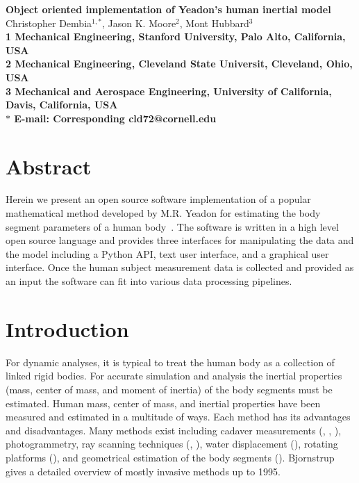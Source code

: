 \documentclass[10pt]{article}
\date{}
\begin{document}
\begin{flushleft}
{\Large
\textbf{Object oriented implementation of Yeadon's human inertial model}
}
\\
Christopher Dembia$^{1,\ast}$,
Jason K. Moore$^{2}$,
Mont Hubbard$^{3}$
\\
\bf{1} Mechanical Engineering, Stanford University, Palo Alto, California, USA
\\
\bf{2} Mechanical Engineering, Cleveland State Universit, Cleveland, Ohio, USA
\\
\bf{3} Mechanical and Aerospace Engineering, University of California, Davis, California, USA
\\
$\ast$ E-mail: Corresponding cld72@cornell.edu
\end{flushleft}

\section*{Abstract}
Herein we present an open source software implementation of a popular
mathematical method developed by M.R. Yeadon for estimating the body segment
parameters of a human body~\cite{Yeadon1990f}. The software is written in a
high level open source language and provides three interfaces for manipulating
the data and the model including a Python API, text user interface, and a
graphical user interface. Once the human subject measurement data is collected
and provided as an input the software can fit into various data processing
pipelines.

\section*{Introduction}
For dynamic analyses, it is typical to treat the human body as a collection of
linked rigid bodies. For accurate simulation and analysis the inertial
properties (mass, center of mass, and moment of inertia) of the body segments
must be estimated. Human mass, center of mass, and inertial properties have
been measured and estimated in a multitude of ways. Each method has its
advantages and disadvantages. Many methods exist including cadaver measurements
(\cite{Dempster1955}, \cite{Clauser1969}, \cite{Chandler1975}), photogrammetry,
ray scanning techniques (\cite{Zatsiorsky1983}, \cite{Zatsiorsky1990}), water
displacement (\cite{Park1999}), rotating platforms (\cite{Griffiths2005}), and
geometrical estimation of the body segments (\cite{Yeadon1990c}).
Bjornstrup \cite{Bjornstrup1995} gives a detailed overview of mostly invasive
methods up to 1995.
\end{document}
